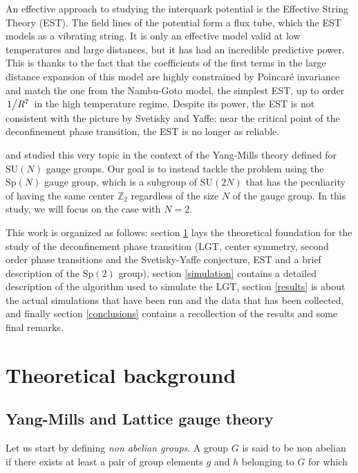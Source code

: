 \documentclass[reqno,12pt]{article}
\numberwithin{equation}{section}
\newcommand{\SU}{\mathrm{SU}}
\newcommand{\Sp}{\mathrm{Sp}}
\begin{document}
An effective approach to studying the interquark potential is the Effective String Theory (EST). The field lines of the 
potential form a flux tube, which the EST models as a vibrating string. It is only an effective model valid at low temperatures
and large distances, but it has had an incredible predictive power. This is thanks to the fact that the coefficients of the
first terms in the large distance expansion of this model are highly constrained by Poincaré invariance and match the one from
the Nambu-Goto model, the simplest EST, up to order $\flatfrac{1}{R^7}$ in the high temperature regime.
Despite its power, the EST is not consistent
with the picture by Svetisky and Yaffe: near the critical point of the deconfinement phase transition, the EST is no longer
as reliable. 

\cite{caselle} and \cite{caristo} studied this very topic in the context of the Yang-Mills theory defined for $\SU(N)$
gauge groups. Our goal is to instead tackle the problem using the $\Sp(N)$ gauge group, which is a subgroup of $\SU(2N)$ that
has the peculiarity of having the same center $\mathbb{Z}_2$ regardless of the size $N$ of the gauge group. In this study, 
we will focus on the case with $N=2$. 

This work is organized as follows: section \ref{background} lays the theoretical foundation for the study of the 
deconfinement phase transition (LGT, center symmetry, second order phase transitions and the Svetisky-Yaffe conjecture,
EST and a brief description of the $\Sp(2)$ group), section \ref{simulation} contains a detailed description of the
algorithm used to simulate the LGT, section \ref{results} is about the actual simulations that have been run and the data that
has been collected, and finally section \ref{conclusions} contains a recollection of the results and some final remarks.

\newpage

\section{Theoretical background} \label{background}

\subsection{Yang-Mills and Lattice gauge theory} \label{lgt}

Let us start by defining \textit{non abelian groups}. A group $G$ is said to be non abelian if there exists at least
a pair of group elements $g$ and $h$ belonging to $G$ for which
\end{document}
